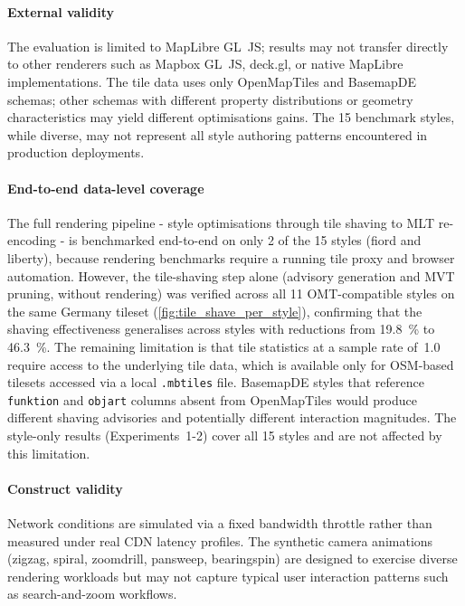 \paragraph{External validity}
The evaluation is limited to MapLibre GL~JS; results may not transfer directly to other renderers such as Mapbox GL~JS, deck.gl, or native MapLibre implementations.
The tile data uses only OpenMapTiles and BasemapDE schemas; other schemas with different property distributions or geometry characteristics may yield different optimisations gains.
The 15 benchmark styles, while diverse, may not represent all style authoring patterns encountered in production deployments.

\paragraph{End-to-end data-level coverage}
The full rendering pipeline - style optimisations through tile shaving to \ac{MLT} re-encoding - is benchmarked end-to-end on only 2 of the 15 styles (fiord and liberty), because rendering benchmarks require a running tile proxy and browser automation.
However, the tile-shaving step alone (advisory generation and \ac{MVT} pruning, without rendering) was verified across all 11 \ac{OMT}-compatible styles on the same Germany tileset (\cref{fig:tile_shave_per_style}), confirming that the shaving effectiveness generalises across styles with reductions from \qty{19.8}{\percent} to \qty{46.3}{\percent}.
The remaining limitation is that tile statistics at a sample rate of~1.0 require access to the underlying tile data, which is available only for \ac{OSM}-based tilesets accessed via a local \texttt{.mbtiles} file.
BasemapDE styles that reference \texttt{funktion} and \texttt{objart} columns absent from OpenMapTiles would produce different shaving advisories and potentially different interaction magnitudes.
The style-only results (Experiments~1-2) cover all 15 styles and are not affected by this limitation.

\paragraph{Construct validity}
Network conditions are simulated via a fixed bandwidth throttle rather than measured under real \ac{CDN} latency profiles.
The synthetic camera animations (zigzag, spiral, zoomdrill, pansweep, bearingspin) are designed to exercise diverse rendering workloads but may not capture typical user interaction patterns such as search-and-zoom workflows.

